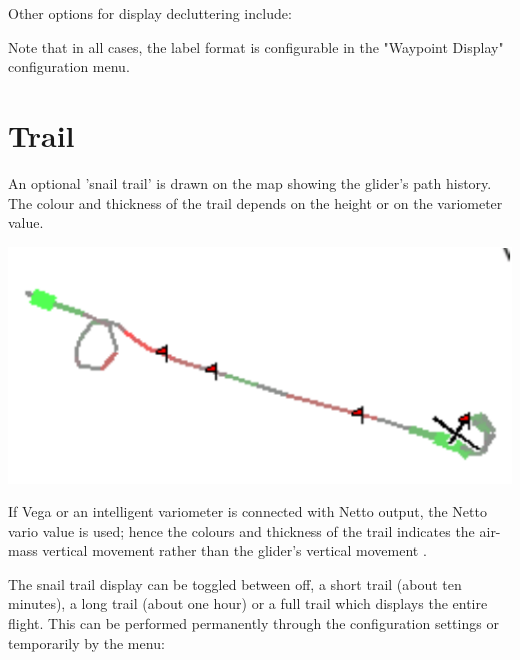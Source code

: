 Other options for display decluttering include:


Note that in all cases, the label format is configurable in the 
"Waypoint Display" configuration menu.  


\section{Trail}\label{sec:trail}

An optional 'snail trail' is drawn on the map showing the glider's
path history.  The colour and thickness of the trail depends on the height or
on the variometer value.  

\begin{center}
\includegraphics[angle=0,width=0.8\linewidth,keepaspectratio='true']{figures/snail.pdf}
\end{center}

If Vega or an intelligent variometer is connected with Netto output,
the Netto vario value is used; hence the colours and thickness of the
trail indicates the air-mass vertical movement rather than the glider's
vertical movement	.

The snail trail display can be toggled between off, a short trail
(about ten minutes), a long trail (about one hour) or a full trail
which displays the entire flight.  This can be performed permanently
through the configuration  settings or temporarily by the
menu:
\begin{quote}
\blink{}
\end{quote}

